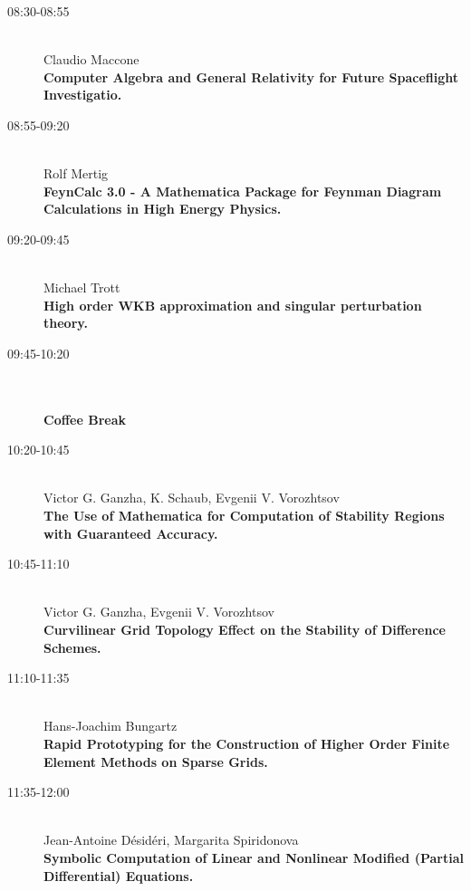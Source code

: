 \begin{description}
\item[08:30-08:55] \ \\
  Claudio Maccone\\
  {\bf Computer Algebra and General Relativity for Future Spaceflight Investigatio.} 
\item[08:55-09:20] \ \\
  Rolf Mertig
\\
  {\bf FeynCalc 3.0 - A Mathematica Package for Feynman Diagram Calculations in High
    Energy Physics.} 
\item[09:20-09:45] \ \\
  Michael Trott
\\
  {\bf High order WKB approximation and singular perturbation theory.}
  
\item[09:45-10:20] \ \\
  \ \\
  {\bf Coffee Break}
\item[10:20-10:45] \ \\
  Victor G. Ganzha, K. Schaub, Evgenii V. Vorozhtsov
\\
  {\bf The Use of Mathematica for Computation of Stability Regions with Guaranteed
    Accuracy.} 
\item[10:45-11:10 ] \ \\
  Victor G. Ganzha, Evgenii V. Vorozhtsov \\
  {\bf Curvilinear Grid Topology Effect on the Stability of Difference Schemes.} 
\item[11:10-11:35] \ \\
  Hans-Joachim Bungartz\\
  {\bf Rapid Prototyping for the Construction of Higher Order Finite Element Methods on
    Sparse Grids.} 
\item[11:35-12:00] \ \\
  Jean-Antoine D\'esid\'eri, Margarita Spiridonova\\
  {\bf Symbolic Computation of Linear and Nonlinear Modified (Partial Differential)
    Equations.} 
\end{description}

